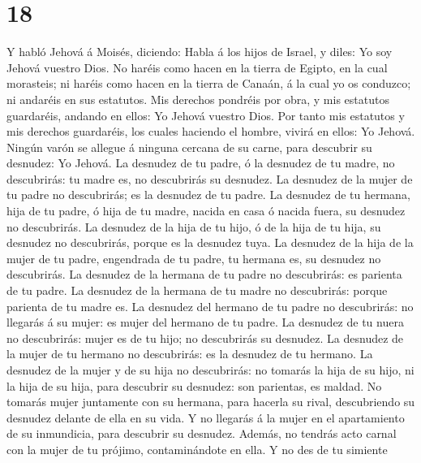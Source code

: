 \hypertarget{section-17}{%
\section{18}\label{section-17}}

 Y habló Jehová á Moisés, diciendo:  Habla á
los hijos de Israel, y diles: Yo soy Jehová vuestro Dios. 
No haréis como hacen en la tierra de Egipto, en la cual morasteis; ni
haréis como hacen en la tierra de Canaán, á la cual yo os conduzco; ni
andaréis en sus estatutos.  Mis derechos pondréis por
obra, y mis estatutos guardaréis, andando en ellos: Yo Jehová vuestro
Dios.  Por tanto mis estatutos y mis derechos guardaréis,
los cuales haciendo el hombre, vivirá en ellos: Yo Jehová.
 Ningún varón se allegue á ninguna cercana de su carne,
para descubrir su desnudez: Yo Jehová.  La desnudez de tu
padre, ó la desnudez de tu madre, no descubrirás: tu madre es, no
descubrirás su desnudez.  La desnudez de la mujer de tu
padre no descubrirás; es la desnudez de tu padre.  La
desnudez de tu hermana, hija de tu padre, ó hija de tu madre, nacida en
casa ó nacida fuera, su desnudez no descubrirás.  La
desnudez de la hija de tu hijo, ó de la hija de tu hija, su desnudez no
descubrirás, porque es la desnudez tuya.  La desnudez de
la hija de la mujer de tu padre, engendrada de tu padre, tu hermana es,
su desnudez no descubrirás.  La desnudez de la hermana de
tu padre no descubrirás: es parienta de tu padre.  La
desnudez de la hermana de tu madre no descubrirás: porque parienta de tu
madre es.  La desnudez del hermano de tu padre no
descubrirás: no llegarás á su mujer: es mujer del hermano de tu padre.
 La desnudez de tu nuera no descubrirás: mujer es de tu
hijo; no descubrirás su desnudez.  La desnudez de la
mujer de tu hermano no descubrirás: es la desnudez de tu hermano.
 La desnudez de la mujer y de su hija no descubrirás: no
tomarás la hija de su hijo, ni la hija de su hija, para descubrir su
desnudez: son parientas, es maldad.  No tomarás mujer
juntamente con su hermana, para hacerla su rival, descubriendo su
desnudez delante de ella en su vida.  Y no llegarás á la
mujer en el apartamiento de su inmundicia, para descubrir su desnudez.
 Además, no tendrás acto carnal con la mujer de tu
prójimo, contaminándote en ella.  Y no des de tu simiente
